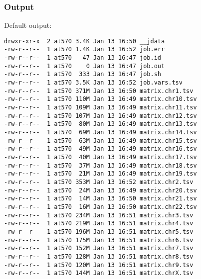 \subsubsection{Output} %
Default output: %
\begin{lstlisting}
drwxr-xr-x  2 at570 3.4K Jan 13 16:50 __jdata
-rw-r--r--  1 at570 1.4K Jan 13 16:52 job.err
-rw-r--r--  1 at570   47 Jan 13 16:47 job.id
-rw-r--r--  1 at570    0 Jan 13 16:47 job.out
-rw-r--r--  1 at570  333 Jan 13 16:47 job.sh
-rw-r--r--  1 at570 3.5K Jan 13 16:52 job.vars.tsv
-rw-r--r--  1 at570 371M Jan 13 16:50 matrix.chr1.tsv
-rw-r--r--  1 at570 110M Jan 13 16:49 matrix.chr10.tsv
-rw-r--r--  1 at570 109M Jan 13 16:49 matrix.chr11.tsv
-rw-r--r--  1 at570 107M Jan 13 16:49 matrix.chr12.tsv
-rw-r--r--  1 at570  80M Jan 13 16:49 matrix.chr13.tsv
-rw-r--r--  1 at570  69M Jan 13 16:49 matrix.chr14.tsv
-rw-r--r--  1 at570  63M Jan 13 16:49 matrix.chr15.tsv
-rw-r--r--  1 at570  49M Jan 13 16:49 matrix.chr16.tsv
-rw-r--r--  1 at570  40M Jan 13 16:49 matrix.chr17.tsv
-rw-r--r--  1 at570  37M Jan 13 16:49 matrix.chr18.tsv
-rw-r--r--  1 at570  21M Jan 13 16:49 matrix.chr19.tsv
-rw-r--r--  1 at570 353M Jan 13 16:52 matrix.chr2.tsv
-rw-r--r--  1 at570  24M Jan 13 16:49 matrix.chr20.tsv
-rw-r--r--  1 at570  14M Jan 13 16:50 matrix.chr21.tsv
-rw-r--r--  1 at570  16M Jan 13 16:50 matrix.chr22.tsv
-rw-r--r--  1 at570 234M Jan 13 16:51 matrix.chr3.tsv
-rw-r--r--  1 at570 219M Jan 13 16:51 matrix.chr4.tsv
-rw-r--r--  1 at570 196M Jan 13 16:51 matrix.chr5.tsv
-rw-r--r--  1 at570 175M Jan 13 16:51 matrix.chr6.tsv
-rw-r--r--  1 at570 152M Jan 13 16:51 matrix.chr7.tsv
-rw-r--r--  1 at570 128M Jan 13 16:51 matrix.chr8.tsv
-rw-r--r--  1 at570 120M Jan 13 16:51 matrix.chr9.tsv
-rw-r--r--  1 at570 144M Jan 13 16:51 matrix.chrX.tsv
\end{lstlisting}
% 
% 
\clearpage